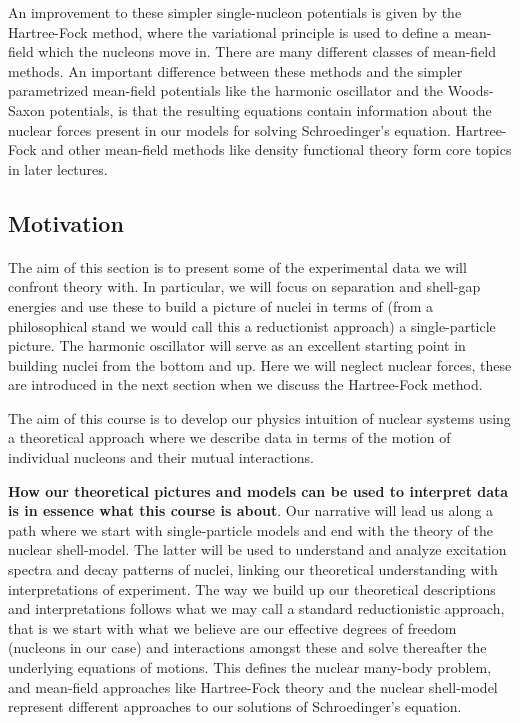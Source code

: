 \documentclass[%
twoside,                 %
final,                   %
10pt]{article}
\begin{document}
An improvement to these simpler single-nucleon potentials is given by the Hartree-Fock method, where the variational principle is used to define a mean-field which the nucleons move in. There are many different classes of mean-field methods.
An important difference between these methods and the simpler parametrized mean-field potentials like the harmonic oscillator and the Woods-Saxon potentials, is that the resulting equations contain information about the nuclear forces present in our models for solving Schroedinger's equation. Hartree-Fock and other mean-field methods like density functional theory form core topics in later lectures.




\subsection*{Motivation}

\paragraph{}
The aim of this section is to present some of the experimental data we will confront theory with. In particular, we will focus on separation and shell-gap energies and use these to build a picture of nuclei in terms of (from a philosophical stand we would call this  a reductionist approach) a single-particle picture. The harmonic oscillator will serve as an excellent starting point in building nuclei from the bottom and up. Here we will neglect nuclear forces, these are introduced in the next section when we discuss the Hartree-Fock method. 

The aim of this course is to develop our physics intuition of nuclear systems using  a theoretical approach  where we describe data in terms of 
the motion of individual nucleons and their mutual interactions. 

\textbf{How our theoretical pictures and models can be used to interpret data is in essence what this course is about}. Our narrative will lead us along a path where we start with single-particle models and end with the theory of the nuclear shell-model. The latter will be used to understand and analyze excitation spectra and decay patterns of nuclei, linking our theoretical understanding with interpretations of experiment. The way we build up our theoretical descriptions and interpretations follows what we may call a standard reductionistic approach, that is we start with what we believe are our effective degrees of freedom (nucleons in our case) and interactions amongst these and solve thereafter the underlying equations of motions. This defines the nuclear many-body problem, and mean-field approaches like Hartree-Fock theory and the nuclear shell-model represent different approaches to our solutions of Schroedinger's equation.
\end{document}
